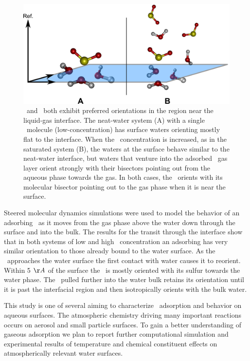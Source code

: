 \begin{figure}[h!]
	\begin{center}
		\includegraphics[scale=1.0]{images/angle-cartoons/system-surface.png}
		\caption{\wat~and \suldiox~both exhibit preferred orientations in the region near the liquid-gas interface. The neat-water system (A) with a single \suldiox~molecule (low-concentration) has surface waters orienting mostly flat to the interface. When the \suldiox~concentration is increased, as in the saturated system (B), the waters at the surface behave similar to the neat-water interface, but waters that venture into the adsorbed \suldiox~gas layer orient strongly with their bisectors pointing out from the aqueous phase towards the gas. In both cases, the \suldiox~orients with its molecular bisector pointing out to the gas phase when it is near the surface.}
		\label{fig:so2-surface-cartoon}
	\end{center}
\end{figure}

Steered molecular dynamics simulations were used to model the behavior of an adsorbing \suldiox~as it moves from the gas phase above the water down through the surface and into the bulk. The results for the transit through the interface show that in both systems of low and high \suldiox~concentration an adsorbing \suldiox has very similar orientation to those already bound to the water surface. As the \suldiox~approaches the water surface the first contact with water causes it to reorient. Within 5 $\AA$ of the surface the \suldiox~is mostly oriented with its sulfur towards the water phase. The \suldiox~pulled further into the water bulk retains its orientation until it is past the interfacial region and then isotropically orients with the bulk water.

This study is one of several aiming to characterize \suldiox~adsorption and behavior on aqueous surfaces. The atmospheric chemistry driving many important reactions occurs on aerosol and small particle surfaces. To gain a better understanding of gaseous adsorption we plan to report further computational simulation and experimental results of temperature and chemical constituent effects on atmospherically relevant water surfaces.
